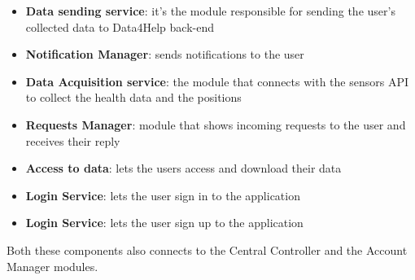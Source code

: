 \begin{itemize}
    \item \textbf{Data sending service}: it's the module responsible for sending the user's collected data to Data4Help back-end
    \item \textbf{Notification Manager}: sends notifications to the user
    \item \textbf{Data Acquisition service}: the module that connects with the sensors API to collect the health data and the positions
    \item \textbf{Requests Manager}: module that shows incoming requests to the user and receives their reply  
    \item \textbf{Access to data}: lets the users access and download their data
    \item \textbf{Login Service}: lets the user sign in to the application
    \item \textbf{Login Service}: lets the user sign up to the application
\end{itemize}
Both these components also connects to the Central Controller and the Account Manager modules.

\clearpage

